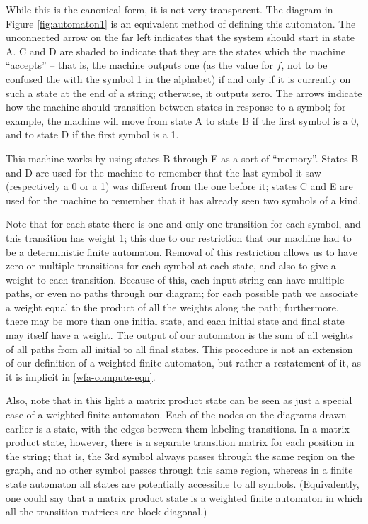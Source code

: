 \documentclass[12pt]{amsbook}
\theoremstyle{plain}
\theoremstyle{definition}
\theoremstyle{remark}
\begin{document}
While this is the canonical form, it is not very transparent.  The diagram in Figure \ref{fig:automaton1} is an equivalent method of defining this automaton.  The unconnected arrow on the far left indicates that the system should start in state A.  C and D are shaded to indicate that they are the states which the machine ``accepts'' -- that is, the machine outputs one (as the value for $f$, not to be confused the with the symbol 1 in the alphabet) if and only if it is currently on such a state at the end of a string;  otherwise, it outputs zero.  The arrows indicate how the machine should transition between states in response to a symbol;  for example, the machine will move from state A to state B if the first symbol is a 0, and to state D if the first symbol is a 1.

This machine works by using states B through E as a sort of ``memory''.  States B and D are used for the machine to remember that the last symbol it saw (respectively a 0 or a 1) was different from the one before it;  states C and E are used for the machine to remember that it has already seen two symbols of a kind.

Note that for each state there is one and only one transition for each symbol, and this transition has weight 1;  this due to our restriction that our machine had to be a deterministic finite automaton.  Removal of this restriction allows us to have zero or multiple transitions for each symbol at each state, and also to give a weight to each transition.  Because of this, each input string can have multiple paths, or even no paths through our diagram;  for each possible path we associate a weight equal to the product of all the weights along the path;  furthermore, there may be more than one initial state, and each initial state and final state may itself have a weight.  The output of our automaton is the sum of all weights of all paths from all initial to all final states.  This procedure is not an extension of our definition of a weighted finite automaton, but rather a restatement of it, as it is implicit in \eqref{wfa-compute-eqn}.

Also, note that in this light a matrix product state can be seen as just a special case of a weighted finite automaton.  Each of the nodes on the diagrams drawn earlier is a state, with the edges between them labeling transitions.  In a matrix product state, however, there is a separate transition matrix for each position in the string; that is, the 3rd symbol always passes through the same region on the graph, and no other symbol passes through this same region, whereas in a finite state automaton all states are potentially accessible to all symbols.  (Equivalently, one could say that a matrix product state is a weighted finite automaton in which all the transition matrices are block diagonal.)
\end{document}
